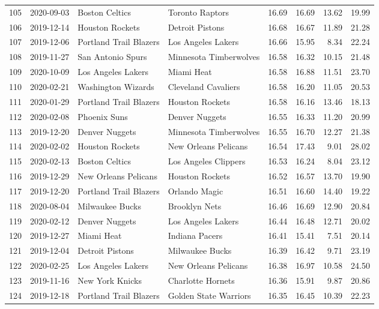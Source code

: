 \documentclass[
  11pt,
]{article}
\theoremstyle{nonumberplain}
\begin{document}
\begin{longtable}{rl|llr|rrr}
105 & 2020-09-03 & Boston Celtics & Toronto Raptors & 16.69 & 16.69 & 13.62 & 19.99\\
106 & 2019-12-14 & Houston Rockets & Detroit Pistons & 16.68 & 16.67 & 11.89 & 21.28\\
107 & 2019-12-06 & Portland Trail Blazers & Los Angeles Lakers & 16.66 & 15.95 & 8.34 & 22.24\\
108 & 2019-11-27 & San Antonio Spurs & Minnesota Timberwolves & 16.58 & 16.32 & 10.15 & 21.48\\
109 & 2020-10-09 & Los Angeles Lakers & Miami Heat & 16.58 & 16.88 & 11.51 & 23.70\\
110 & 2020-02-21 & Washington Wizards & Cleveland Cavaliers & 16.58 & 16.20 & 11.05 & 20.53\\
111 & 2020-01-29 & Portland Trail Blazers & Houston Rockets & 16.58 & 16.16 & 13.46 & 18.13\\
112 & 2020-02-08 & Phoenix Suns & Denver Nuggets & 16.55 & 16.33 & 11.20 & 20.99\\
113 & 2019-12-20 & Denver Nuggets & Minnesota Timberwolves & 16.55 & 16.70 & 12.27 & 21.38\\
114 & 2020-02-02 & Houston Rockets & New Orleans Pelicans & 16.54 & 17.43 & 9.01 & 28.02\\
115 & 2020-02-13 & Boston Celtics & Los Angeles Clippers & 16.53 & 16.24 & 8.04 & 23.12\\
116 & 2019-12-29 & New Orleans Pelicans & Houston Rockets & 16.52 & 16.57 & 13.70 & 19.90\\
117 & 2019-12-20 & Portland Trail Blazers & Orlando Magic & 16.51 & 16.60 & 14.40 & 19.22\\
118 & 2020-08-04 & Milwaukee Bucks & Brooklyn Nets & 16.46 & 16.69 & 12.90 & 20.84\\
119 & 2020-02-12 & Denver Nuggets & Los Angeles Lakers & 16.44 & 16.48 & 12.71 & 20.02\\
120 & 2019-12-27 & Miami Heat & Indiana Pacers & 16.41 & 15.41 & 7.51 & 20.14\\
121 & 2019-12-04 & Detroit Pistons & Milwaukee Bucks & 16.39 & 16.42 & 9.71 & 23.19\\
122 & 2020-02-25 & Los Angeles Lakers & New Orleans Pelicans & 16.38 & 16.97 & 10.58 & 24.50\\
123 & 2019-11-16 & New York Knicks & Charlotte Hornets & 16.36 & 15.91 & 9.87 & 20.86\\
124 & 2019-12-18 & Portland Trail Blazers & Golden State Warriors & 16.35 & 16.45 & 10.39 & 22.23\\

\end{longtable}
\end{document}
